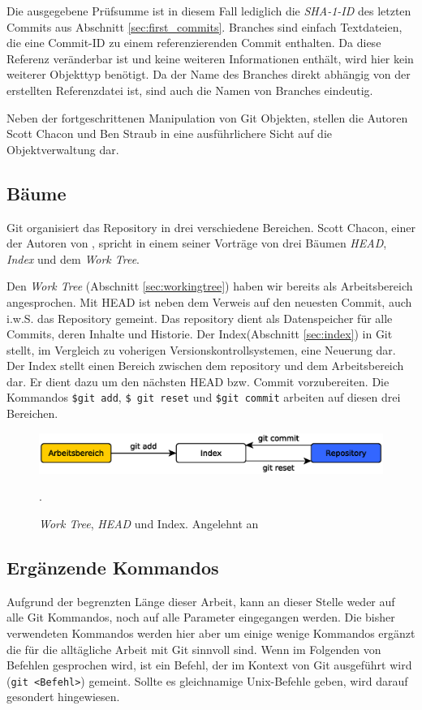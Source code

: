 Die ausgegebene Prüfsumme ist in diesem Fall lediglich die \textit{SHA-1-ID} des
letzten Commits aus Abschnitt \ref{sec:first_commits}. Branches sind einfach
Textdateien, die eine Commit-ID zu einem referenzierenden Commit enthalten. Da
diese Referenz veränderbar ist und keine weiteren Informationen enthält, wird
hier kein weiterer Objekttyp benötigt. Da der Name des Branches direkt abhängig
von der erstellten Referenzdatei ist, sind auch die Namen von Branches
eindeutig.

Neben der fortgeschrittenen Manipulation von Git Objekten, stellen die Autoren
Scott Chacon und Ben Straub in \cite[S.~408-418]{progit} eine ausführlichere
Sicht auf die Objektverwaltung dar.

\subsection{Bäume}\label{sec:trees}
Git organisiert das Repository in drei verschiedene Bereichen. Scott Chacon,
einer der Autoren von \cite{progit}, spricht in einem seiner
Vorträge\cite{link:talesoftrees} von drei Bäumen \textit{HEAD}, \textit{Index}
und dem \textit{Work Tree}.

Den \textit{Work Tree} (Abschnitt \ref{sec:workingtree}) haben wir bereits als
Arbeitsbereich angesprochen. Mit \gls{HEAD} ist neben dem Verweis auf den
neuesten Commit, auch i.w.S. das Repository gemeint. Das \gls{repository} dient
als Datenspeicher für alle Commits, deren Inhalte und Historie. Der
Index(Abschnitt \ref{sec:index}) in Git stellt, im Vergleich zu voherigen
Versionskontrollsystemen, eine Neuerung dar. Der Index stellt einen Bereich
zwischen dem \gls{repository} und dem Arbeitsbereich dar. Er dient dazu um den
nächsten \gls{HEAD} bzw. Commit vorzubereiten. Die Kommandos \texttt{\$git
add}, \texttt{\$ git reset} und \texttt{\$git commit} arbeiten auf diesen drei
Bereichen.\cite[34-35]{gitosp}

\begin{figure}[h]
    \centering
    \includegraphics[scale=0.60]{images/trees.eps}
    \caption{\textit{Work Tree}, \textit{HEAD} und Index. Angelehnt an
    \cite[34]{gitosp}}.
    \label{fig:trees}
\end{figure}

\subsection{Ergänzende Kommandos}\label{sec:commands}
Aufgrund der begrenzten Länge dieser Arbeit, kann an dieser Stelle weder auf
alle Git Kommandos, noch auf alle Parameter eingegangen werden. Die bisher
verwendeten Kommandos werden hier aber um einige wenige Kommandos ergänzt die
für die alltägliche Arbeit mit Git sinnvoll sind. Wenn im Folgenden von
Befehlen gesprochen wird, ist ein Befehl, der im Kontext von Git ausgeführt
wird (\texttt{git <Befehl>}) gemeint. Sollte es gleichnamige Unix-Befehle
geben, wird darauf gesondert hingewiesen.

